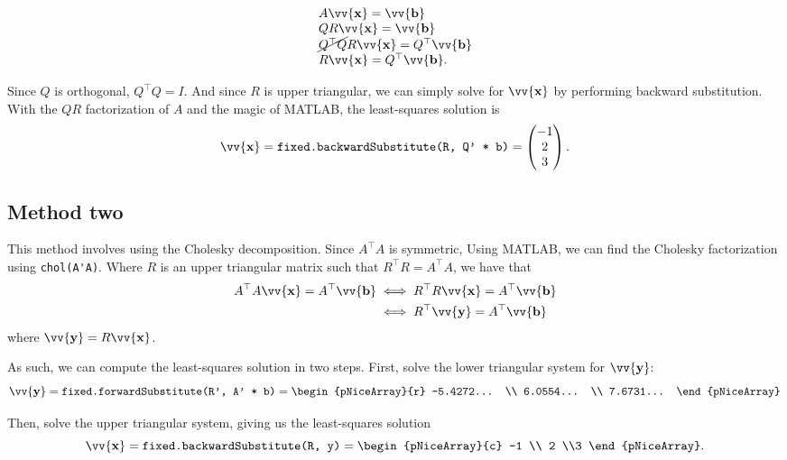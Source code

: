 \documentclass[12pt]{article}
\newcommand{\vect}[1]{\vv{\mathbf{#1}}}
\newcommand{\code}[1]{\texttt{#1}}
\begin{document}
$$
\begin{array}{ll}
A\vect{x} = \vect{b} \\
QR\vect{x} = \vect{b} \\
\cancel{Q^\top Q}R\vect{x} = Q^\top\vect{b}  \\
R\vect{x} = Q^\top\vect{b}.
\end{array}
$$

Since $Q$ is orthogonal, $Q^\top Q=I$. And since $R$ is upper triangular, we can simply solve for $\vect{x}$ by performing backward substitution. With the $QR$ factorization of $A$ and the magic of MATLAB, the least-squares solution is
$$
\vect{x} = \code{fixed.backwardSubstitute(R, Q' * b)} = \begin{pmatrix}
    -1 \\ 2 \\ 3
\end{pmatrix}.
$$

\subsection*{Method two}

This method involves using the Cholesky decomposition. Since $A^\top A$ is symmetric, Using MATLAB, we can find the Cholesky factorization using \verb|chol(A'A)|. Where $R$ is  an upper triangular matrix such that $R^\top R = A^\top A$, we have that
\begin{align*}
    A^\top A\vect{x} = A^\top\vect{b} &\iff R^\top R\vect{x} = A^\top\vect{b} \\
    &\iff R^\top\vect{y} = A^\top\vect{b}
\end{align*}
where $\vect{y} = R\vect{x}$.

As such, we can compute the least-squares solution in two steps. First, solve the lower triangular system for $\vect{y}$:
$$
\vect{y} = \code{fixed.forwardSubstitute(R', A' * b)} = \begin{pNiceArray}{r}
    -5.4272... \\
    6.0554... \\
    7.6731...
\end{pNiceArray}
$$

Then, solve the upper triangular system, giving us the least-squares solution
$$
\vect{x} = \code{fixed.backwardSubstitute(R, y)} = \begin{pNiceArray}{c}
    -1 \\ 2 \\3
\end{pNiceArray}.
$$
\end{document}
